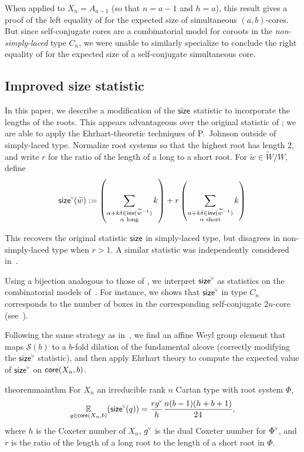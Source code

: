 \documentclass[ALCO,published]{cedram}
\newcommand{\chk}[1]{#1^{\normalfont\smash{\scalebox{.5}[.5]{\rotatebox{90}{\textbf{\textless}}}}}}
\newcommand{\Expt}[2]{\operatorname*{\mathbb{E}}\limits_{#1}(#2)}
\newcommand{\wa}{\widetilde{W}}
\newcommand{\Sommers}{\mathcal{S}}
\newcommand{\core}{{\sf core}}
\newcommand{\waf}{\widetilde{w}}
\newcommand{\size}{{\sf size}}
\begin{document}
When applied to $X_n=A_{a-1}$ (so that $n=a-1$ and $h=a$), this result gives a proof of the left equality of  for the expected size of simultaneous $(a,b)$-cores.  But since self-conjugate cores are a combinatorial model for coroots in the \emph{non-simply-laced} type $C_n$, we were unable to similarly specialize  to conclude the right equality of  for the expected size of a self-conjugate simultaneous core.  


\subsection{Improved size statistic}
In this paper, we describe a modification of the $\size$ statistic to incorporate the lengths of the roots. This appears advantageous over the original statistic of \cite{thiel2017strange}; we are able to apply the Ehrhart-theoretic techniques of P.~Johnson outside of simply-laced type. Normalize root systems so that the highest root has length $2$, and write $r$ for the ratio of the length of a long to a short root. For $\waf \in \wa/W$, define 
\begin{equation}
\label{eqn:size_def}
    \chk{\size}(\waf) := \left(\sum_{\substack{\alpha+k\delta \in \mathsf{inv}(\waf^{-1})\\\alpha \text{ long}}}k\right)+r\left(\sum_{\substack{\alpha+k\delta \in \mathsf{inv}(\waf^{-1})\\\alpha \text{ short}}}k\right) 
\end{equation}

This recovers the original statistic $\size$ in simply-laced type, but disagrees in non-simply-laced type when $r>1$.  A similar statistic was independently considered in~\cite{chapelier2022atomic}.

Using a bijection analogous to those of , we interpret $\chk{\size}$ as statistics on the combinatorial models of~. For instance, we shows that $\chk{\size}$ in type $C_n$ corresponds to the number of boxes in the corresponding self-conjugate $2n$-core (see~).

Following the same strategy as in~\cite{thiel2017strange}, we find an affine Weyl group element that maps $\Sommers(b)$ to a $b$-fold dilation of the fundamental alcove (correctly modifying the $\chk{\size}$ statistic), and then apply Ehrhart theory to compute the expected value of $\chk{\size}$ on $\core(X_n,b)$.

\begin{restatable}{theorem}{mainthm}
\label{thm:main_thm}
For $X_n$ an irreducible rank $n$ Cartan type with root system $\Phi$,
\begin{equation*}
\Expt{q \in \core(X_n,b)}{\chk{\size}(q)}=\frac{r \chk{g}}{h}\frac{n(b-1)(h+b+1)}{24},
\end{equation*}
where $h$ is the Coxeter number of $X_n$, $\chk{g}$ is the dual Coxeter number for $\chk{\Phi}$, and $r$ is the ratio of the length of a long root to the length of a short root in $\Phi$.
\end{restatable}
\end{document}
